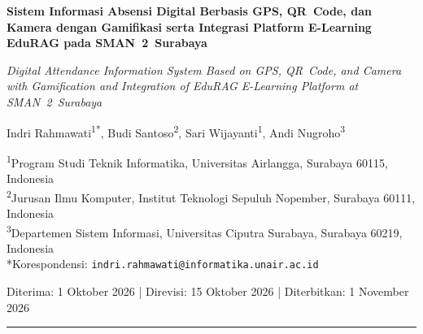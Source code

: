 \documentclass[12pt,a4paper]{article}
\newcommand{\sman}{SMAN~2~Surabaya}
\newcommand{\edurag}{EduRAG}
\begin{document}
\begin{titlepage}
\centering
\vspace*{2cm}
{\LARGE\bfseries Sistem Informasi Absensi Digital Berbasis GPS,
QR~Code, dan Kamera dengan Gamifikasi serta Integrasi
Platform E-Learning \edurag{} pada \sman{}\par}
\vspace{1cm}
{\large\itshape Digital Attendance Information System Based on GPS,
QR~Code, and Camera with Gamification and Integration of
\edurag{} E-Learning Platform at SMAN~2~Surabaya\par}
\vspace{2cm}
{\large
Indri Rahmawati\textsuperscript{1*},
Budi Santoso\textsuperscript{2},
Sari Wijayanti\textsuperscript{1},
Andi Nugroho\textsuperscript{3}
\par}
\vspace{0.5cm}
{\normalsize
\textsuperscript{1}Program Studi Teknik Informatika, Universitas
Airlangga, Surabaya 60115, Indonesia\\
\textsuperscript{2}Jurusan Ilmu Komputer, Institut Teknologi
Sepuluh Nopember, Surabaya 60111, Indonesia\\
\textsuperscript{3}Departemen Sistem Informasi, Universitas
Ciputra Surabaya, Surabaya 60219, Indonesia\\
\vspace{0.3cm}
*Korespondensi: \texttt{indri.rahmawati@informatika.unair.ac.id}
\par}
\vspace{2cm}
{\normalsize
Diterima: 1 Oktober 2026 \quad|\quad
Direvisi: 15 Oktober 2026 \quad|\quad
Diterbitkan: 1 November 2026
\par}
\vspace{1cm}
\noindent\rule{\textwidth}{0.4pt}
\end{titlepage}
\end{document}
